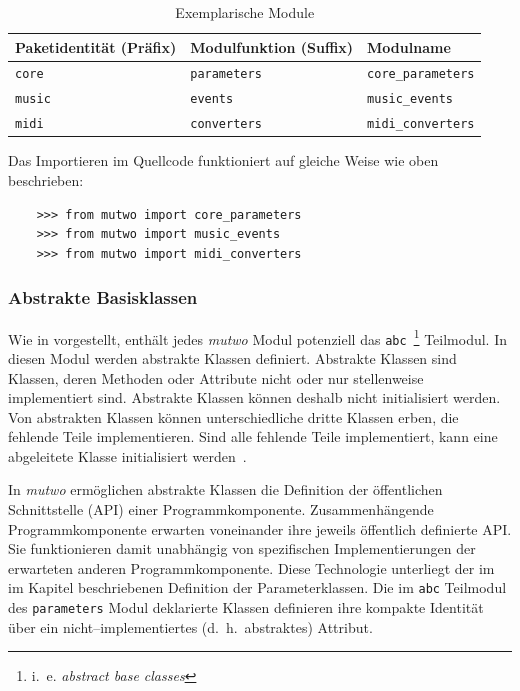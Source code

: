 \documentclass[12pt,a4paper,ngerman]{article}
\begin{document}
\begin{table}[H]
    \begin{center}
        \begin{tabular}{l l l}
            \hline
            Paketidentität (Präfix) & Modulfunktion (Suffix) & Modulname \\ [0.5ex] 
            \hline\hline
            \texttt{core} & \texttt{parameters} & \texttt{core\_parameters} \\
            \texttt{music} & \texttt{events} & \texttt{music\_events} \\
            \texttt{midi} & \texttt{converters} & \texttt{midi\_converters} \\
            \hline
        \end{tabular}
    \end{center}

    \caption{Exemplarische Module}
\end{table}

Das Importieren im Quellcode funktioniert auf gleiche Weise wie oben beschrieben:

\begin{lstlisting}
    >>> from mutwo import core_parameters
    >>> from mutwo import music_events
    >>> from mutwo import midi_converters
\end{lstlisting}

\subsubsection{Abstrakte Basisklassen}
\label{abstractBaseClasses}

Wie in \emph{} vorgestellt, enthält jedes \emph{mutwo} Modul potenziell das \texttt{abc}~\footnote{%
    i.\ e. \emph{abstract base classes}%
} Teilmodul.
In diesen Modul werden abstrakte Klassen definiert.
Abstrakte Klassen sind Klassen, deren Methoden oder Attribute nicht oder nur stellenweise implementiert sind.
Abstrakte Klassen können deshalb nicht initialisiert werden.
Von abstrakten Klassen können unterschiedliche dritte Klassen erben, die fehlende Teile implementieren.
Sind alle fehlende Teile implementiert, kann eine abgeleitete Klasse initialisiert werden~\parencite{abstractTypeWiki}.

\bigskip

In \emph{mutwo} ermöglichen abstrakte Klassen die Definition der öffentlichen Schnittstelle (API) einer Programmkomponente.
Zusammenhängende Programmkomponente erwarten voneinander ihre jeweils öffentlich definierte API.
Sie funktionieren damit unabhängig von spezifischen Implementierungen der erwarteten anderen Programmkomponente.
Diese Technologie unterliegt der im im Kapitel \emph{} beschriebenen Definition der Parameterklassen.
Die im \texttt{abc} Teilmodul des \texttt{parameters} Modul deklarierte Klassen definieren ihre kompakte Identität über ein nicht--implementiertes (d.~h.\ abstraktes) Attribut.
\end{document}
